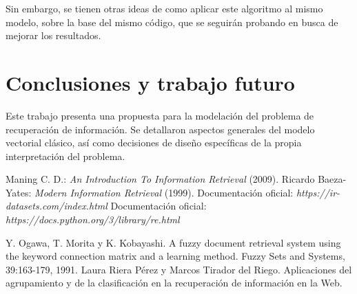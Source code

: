 \documentclass{llncs}
\begin{document}
	 Sin embargo, se tienen otras ideas de como aplicar este algoritmo al mismo modelo, sobre la base del mismo c\'odigo, que se seguir\'an probando en busca de mejorar los resultados.
	 
	\section{Conclusiones y trabajo futuro}
	
	Este trabajo presenta una propuesta para la modelaci\'on del problema de recuperaci\'on de informaci\'on. Se detallaron aspectos generales del modelo vectorial cl\'asico, as\'i como decisiones de dise\~no espec\'ificas de la propia interpretaci\'on del problema. 
	
	\begin{thebibliography}{20}
		 Maning C. D.: \emph{An Introduction To Information Retrieval} (2009).
		 Ricardo Baeza-Yates: \emph{Modern Information Retrieval} (1999).
		 Documentaci\'on oficial: \emph{https://ir-datasets.com/index.html}
		 Documentaci\'on oficial: \emph{https://docs.python.org/3/library/re.html}
		
		 Y. Ogawa, T. Morita y K. Kobayashi. A fuzzy document retrieval system using the keyword connection matrix and a learning method. Fuzzy Sets and Systems, 39:163-179, 1991.		
		 Laura Riera P\'erez y Marcos Tirador del Riego. Aplicaciones del
		agrupamiento y de la clasificación en la recuperaci\'on	de informaci\'on en la Web.
	\end{thebibliography}
	
\end{document}
